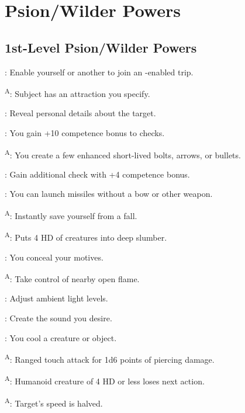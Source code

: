 \section{Psion/Wilder Powers}




\subsection{1st-Level Psion/Wilder Powers}

: Enable yourself or another to join an -enabled trip.

\textsuperscript{A}: Subject has an attraction you specify.

: Reveal personal details about the target.

: You gain +10 competence bonus to  checks.

\textsuperscript{A}: You create a few enhanced short-lived bolts, arrows, or bullets.

: Gain additional  check with +4 competence bonus.

: You can launch missiles without a bow or other weapon.

\textsuperscript{A}: Instantly save yourself from a fall.

\textsuperscript{A}: Puts 4 HD of creatures into deep slumber.

: You conceal your motives.

\textsuperscript{A}: Take control of nearby open flame.

: Adjust ambient light levels.

: Create the sound you desire.

: You cool a creature or object.

\textsuperscript{A}: Ranged touch attack for 1d6 points of piercing damage.

\textsuperscript{A}: Humanoid creature of 4 HD or less loses next action.

\textsuperscript{A}: Target's speed is halved.

